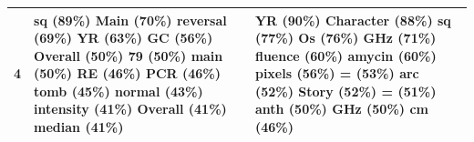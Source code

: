 \documentclass{article}
\begin{document}
\begin{table}[htbp]
\begin{tabular}{p{1.4cm} p{6cm} p{6cm}}
\midrule
4 & \colorbox{lightOlmoeLightBlue}{ sq} (89\%) \colorbox{lightOlmoeLightBlue}{Main} (70\%) \colorbox{lightOlmoeLightBlue}{ reversal} (69\%) \colorbox{lightOlmoeLightBlue}{YR} (63\%) \colorbox{lightOlmoeLightBlue}{GC} (56\%) \colorbox{lightOlmoeLightBlue}{Overall} (50\%) \colorbox{lightOlmoeLightBlue}{79} (50\%) \colorbox{lightOlmoeLightBlue}{main} (50\%) \colorbox{lightOlmoeLightBlue}{ RE} (46\%) \colorbox{lightOlmoeLightBlue}{ PCR} (46\%) \colorbox{lightOlmoeLightBlue}{ tomb} (45\%) \colorbox{lightOlmoeLightBlue}{normal} (43\%) \colorbox{lightOlmoeLightBlue}{ intensity} (41\%) \colorbox{lightOlmoeLightBlue}{ Overall} (41\%) \colorbox{lightOlmoeLightBlue}{ median} (41\%) & \colorbox{lightOlmoeLightBlue}{YR} (90\%) \colorbox{lightOlmoeLightBlue}{ Character} (88\%) \colorbox{lightOlmoeLightBlue}{ sq} (77\%) \colorbox{lightOlmoeLightBlue}{Os} (76\%) \colorbox{lightOlmoeLightBlue}{ GHz} (71\%) \colorbox{lightOlmoeLightBlue}{fluence} (60\%) \colorbox{lightOlmoeLightBlue}{amycin} (60\%) \colorbox{lightOlmoeLightBlue}{ pixels} (56\%) \colorbox{lightOlmoeLightBlue}{=} (53\%) \colorbox{lightOlmoeLightBlue}{arc} (52\%) \colorbox{lightOlmoeLightBlue}{ Story} (52\%) \colorbox{lightOlmoeLightBlue}{ =} (51\%) \colorbox{lightOlmoeLightBlue}{anth} (50\%) \colorbox{lightOlmoeLightBlue}{GHz} (50\%) \colorbox{lightOlmoeLightBlue}{ cm} (46\%) \\
\midrule

\end{tabular}
\end{table}
\end{document}

